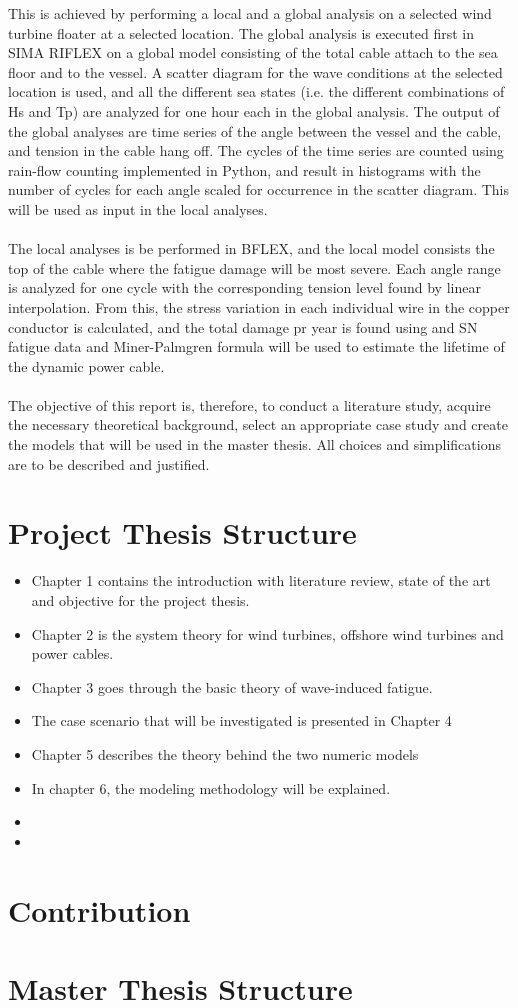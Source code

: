 This is achieved by performing a local and a global analysis on a selected wind turbine floater at a selected location. The global analysis is executed first in SIMA RIFLEX on a global model consisting of the total cable attach to the sea floor and to the vessel. A scatter diagram for the wave conditions at the selected location is used, and all the different sea states (i.e. the different combinations of Hs and Tp) are analyzed for one hour each in the global analysis. The output of the global analyses are time series of the angle between the vessel and the cable, and tension in the cable hang off. The cycles of the time series are counted using rain-flow counting implemented in Python, and result in histograms with the number of cycles for each angle scaled for occurrence in the scatter diagram.  This will be used as input in the local analyses.\\\\ The local analyses is be performed in BFLEX, and the local model consists the top of the cable where the fatigue damage will be most severe. Each angle range is analyzed for one cycle with the corresponding tension level found by linear interpolation. From this, the stress variation in each individual wire in the copper conductor is calculated, and the total damage pr year is found using  and SN fatigue data and Miner-Palmgren formula will be used to estimate the lifetime of the dynamic power cable. \\\\ The objective of this report is, therefore, to conduct a literature study, acquire the necessary theoretical background, select an appropriate case study and create the models that will be used in the master thesis. All choices and simplifications are to be described and justified. 

\section{Project Thesis Structure}
\begin{itemize}
    \item Chapter 1 contains the introduction with literature review, state of the art and objective for the project thesis.
     \item Chapter 2 is the system theory for wind turbines, offshore wind turbines and power cables.
      \item Chapter 3 goes through the basic theory of wave-induced fatigue. 
      \item The case scenario that will be investigated is presented in Chapter 4
      \item Chapter 5 describes the theory behind the two numeric models
      \item In chapter 6, the modeling methodology will be explained.
      \item 
      \item
\end{itemize}
\section{Contribution}


\section{Master Thesis Structure}

